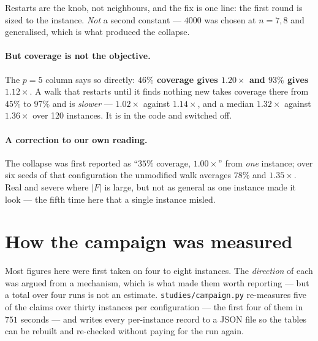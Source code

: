 \documentclass[11pt,a4paper]{article}
\begin{document}
\noindent
Restarts are the knob, not neighbours, and the fix is one line: the first round
is sized to the instance.  \emph{Not} a second constant --- $4000$ was chosen
at $n=7,8$ and generalised, which is what produced the collapse.

\paragraph{But coverage is not the objective.}  The $p=5$ column says so
directly: \textbf{$46\%$ coverage gives $1.20\times$ and $93\%$ gives
$1.12\times$}.  A walk that restarts until it finds nothing new takes coverage
there from $45\%$ to $97\%$ and is \emph{slower} --- $1.02\times$ against
$1.14\times$, and a median $1.32\times$ against $1.36\times$ over 120
instances.  It is in the code and switched off.

\paragraph{A correction to our own reading.}  The collapse was first reported
as ``$35\%$ coverage, $1.00\times$'' from \emph{one} instance; over six seeds
of that configuration the unmodified walk averages $78\%$ and $1.35\times$.
Real and severe where $|F|$ is large, but not as general as one instance made
it look --- the fifth time here that a single instance misled.

\section{How the campaign was measured}

Most figures here were first taken on four to eight instances.  The
\emph{direction} of each was argued from a mechanism, which is what made them
worth reporting --- but a total over four runs is not an estimate.
\texttt{studies/campaign.py} re-measures five of the claims over thirty
instances per configuration --- the first four of them in $751$ seconds --- and
writes every per-instance record to a JSON file so the tables can be rebuilt
and re-checked without paying for the run again.
\end{document}
